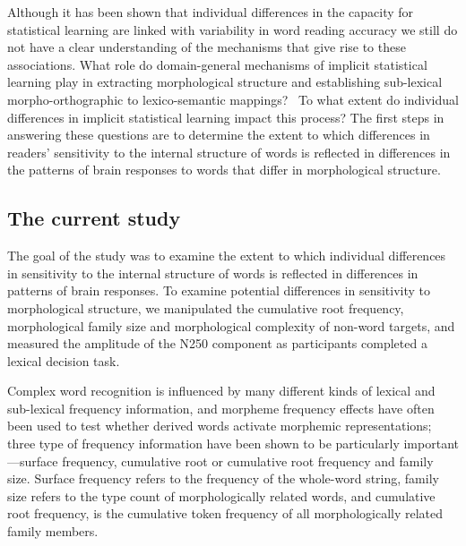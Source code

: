 \documentclass[review]{elsarticle}
\begin{document}
Although it has been shown that individual differences in the capacity for statistical learning are linked with variability in word reading accuracy \citep{arciuliReadingStatisticalLearning2018, arciuliStatisticalLearningRelated2012} we still do not have a clear understanding of the mechanisms that give rise to these associations. What role do domain-general mechanisms of implicit statistical learning play in extracting morphological structure and establishing sub-lexical morpho-orthographic to lexico-semantic mappings?  To what extent do individual differences in implicit statistical learning impact this process? The first steps in answering these questions are to determine the extent to which differences in readers’ sensitivity to the internal structure of words is reflected in differences in the patterns of brain responses to words that differ in morphological structure. 

\subsection{The current study}

The goal of the study was to examine the extent to which  individual differences in sensitivity to the internal structure of words is reflected in differences in  patterns of brain responses. To examine potential differences in sensitivity to morphological structure, we manipulated the cumulative root frequency, morphological family size and morphological complexity of non-word targets, and measured the amplitude of the N250 component as participants completed a lexical decision task.  

Complex word recognition is influenced by many different kinds of lexical and sub-lexical frequency  information, and morpheme frequency effects have often been used to test whether derived words activate morphemic representations; three type of frequency information have been shown to be particularly important—surface frequency, cumulative root or cumulative root frequency and family size. Surface frequency refers to the frequency of the whole-word string, family size refers to the type count of morphologically related words, and cumulative root frequency, is the cumulative token frequency of all morphologically related family members. 
\end{document}
